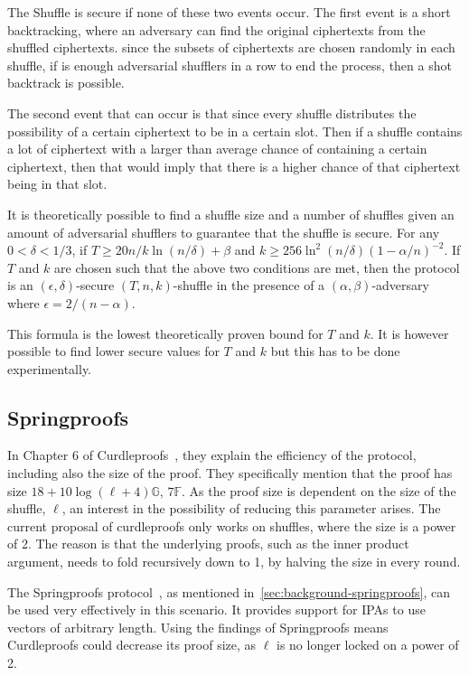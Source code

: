 The Shuffle is secure if none of these two events occur.
The first event is a short backtracking, where an adversary can find the original ciphertexts from the shuffled ciphertexts.
since the subsets of ciphertexts are chosen randomly in each shuffle, if is enough adversarial shufflers in a row to end the process, then a shot backtrack is possible.

The second event that can occur is that since every shuffle distributes the possibility of a certain ciphertext to be in a certain slot.
Then if a shuffle contains a lot of ciphertext with a larger than average chance of containing a certain ciphertext, then that would imply that there is a higher chance of that ciphertext being in that slot.

It is theoretically possible to find a shuffle size and a number of shuffles given an amount of adversarial shufflers to guarantee that the shuffle is secure.
For any $0 < \delta < 1/3$, if $T \geq 20 n / k \ln(n/\delta) + \beta $ and $ k \geq 256 \ln^2(n/\delta)(1 - \alpha/n)^{-2}$.
If $T$ and $k$ are chosen such that the above two conditions are met, then the protocol is an $(\epsilon , \delta)$-secure $(T,n,k)$-shuffle in the presence of a $(\alpha, \beta)$-adversary where $\epsilon = 2/(n-\alpha)$.

This formula is the lowest theoretically proven bound for $T$ and $k$.
It is however possible to find lower secure values for $T$ and $k$ but this has to be done experimentally.



\subsection{Springproofs}\label{sec:approach-springproofs}
In Chapter 6 of Curdleproofs~\cite{Curdleproofs}, they explain the efficiency of the protocol, including also the size of the proof.
They specifically mention that the proof has size $18+10 \log(\ell+4)\mathbb{G}$, $7\mathbb{F}$.
As the proof size is dependent on the size of the shuffle, $\ell$, an interest in the possibility of reducing this parameter arises.
The current proposal of curdleproofs only works on shuffles, where the size is a power of 2.
The reason is that the underlying proofs, such as the inner product argument, needs to fold recursively down to 1, by halving the size in every round.

The Springproofs protocol~\cite{zhang2024springproofs}, as mentioned in~\autoref{sec:background-springproofs}, can be used very effectively in this scenario.
It provides support for IPAs to use vectors of arbitrary length.
Using the findings of Springproofs means Curdleproofs could decrease its proof size, as $\ell$ is no longer locked on a power of 2.

